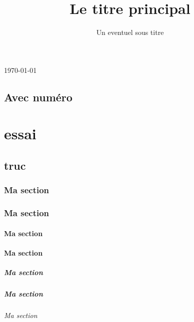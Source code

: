 \documentclass[overfullbox]{polytech}
\title{Le titre principal}
\subtitle{Un eventuel sous titre}
\begin{document}
\maketitle


\today


\lipsum[1-10]

\chapter{Avec numéro}

\part{essai}
\label{part:essai}

\chapter{truc}
\lipsum[1-20]


\section{Ma section}
\lipsum[1-5]

\section{Ma section}
\lipsum[1-5]

\subsection{Ma section}
\lipsum[1-5]
\subsection{Ma section}
\lipsum[1-5]
\subsubsection{Ma section}
\lipsum[1-5]
\subsubsection{Ma section}
\lipsum[1-5]
\paragraph{Ma section}
\lipsum[1-5]
\end{document}
